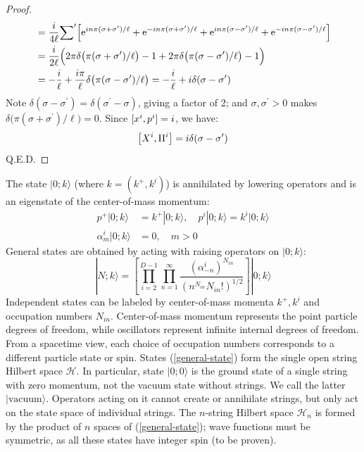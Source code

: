 \begin{tcolorbox}[breakable]
\begin{proof}
\begin{align*}
			&=\frac{i}{ 4\ell}  {\sum}^\prime \Bigl[\mathrm{e}^{i n \pi(\sigma+\sigma^{\prime})/\ell}+\mathrm{e}^{-i n \pi(\sigma+\sigma^{\prime})/\ell}+ \mathrm{e}^{i n \pi(\sigma-\sigma^{\prime})/\ell}+\mathrm{e}^{-i n \pi(\sigma-\sigma^{\prime})/\ell}\Bigr]\\
			&=\frac{i}{2\ell} \Bigl( 2\pi\delta\bigl(\pi(\sigma+\sigma^{\prime})/\ell\bigr)-1+2\pi\delta\bigl(\pi(\sigma-\sigma^{\prime})/\ell\bigr)-1 \Bigr) \\
			&=-\frac{i}{\ell}+\frac{i \pi}{ \ell} \delta\bigl(\pi(\sigma-\sigma^{\prime})/\ell\bigr) 
			=-\frac{i}{\ell}+i \delta(\sigma-\sigma^{\prime})
		\end{align*}
		Note $\delta(\sigma-\sigma^\prime)=\delta(\sigma^\prime-\sigma)$, giving a factor of 2; and $\sigma, \sigma^\prime>0$ makes $\delta\bigl(\pi(\sigma+\sigma^{\prime})/\ell\bigr)=0$. 
		Since $[x^{i}, p^{i}]=i$, we have:
		$$\left[X^{i} , \Pi^{i}\right]=i \delta(\sigma-\sigma^{\prime})$$ 
		Q.E.D.
	\end{proof}
\end{tcolorbox}
The state $|0;k \rangle$ (where $k=(k^+, k^i)$) is annihilated by lowering operators and is an eigenstate of the center-of-mass momentum: 
\begin{subequations}
	\begin{align}
		p^{+}|0 ; k\rangle&=k^{+}|0 ; k\rangle, \quad p^{i}|0 ; k\rangle=k^{i}|0 ; k\rangle \\
		\alpha_{m}^{i}|0 ; k\rangle&=0, \quad m>0
	\end{align}
\end{subequations}
General states are obtained by acting with raising operators on $|0;k \rangle$: 
\begin{equation}
	|N ;  k\rangle=\left[\prod_{i=2}^{D-1} \prod_{n=1}^{\infty} \frac{\left(\alpha_{-n}^{i}\right)^{N_{i n}}}{\left(n^{N_{i n}} N_{i n} !\right)^{1 / 2}}\right]|0 ; k\rangle\label{general-state}
\end{equation}
Independent states can be labeled by center-of-mass momenta $k^+, k^i$ and occupation numbers $N_{in}$. Center-of-mass momentum represents the point particle degrees of freedom, while oscillators represent infinite internal degrees of freedom. From a spacetime view, each choice of occupation numbers corresponds to a different particle state or spin. States (\ref{general-state}) form the single open string Hilbert space $\mathscr{H}$. 
In particular, state $|0;0 \rangle$ is the ground state of a single string with zero momentum, not the vacuum state without strings. We call the latter $|\text{vacuum} \rangle$. Operators acting on it cannot create or annihilate strings, but only act on the state space of individual strings. The $n$-string Hilbert space $\mathscr{H}_n$ is formed by the product of $n$ spaces of (\ref{general-state}); wave functions must be symmetric, as all these states have integer spin (to be proven). 

